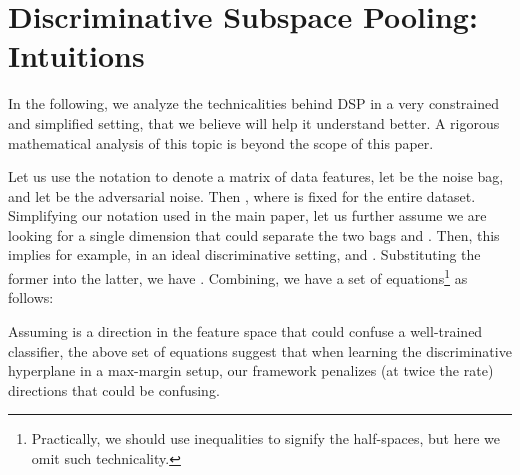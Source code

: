 \documentclass[runningheads]{llncs}
\newcommand{\comment}[1]{}
\begin{document}




\author{Jue Wang\and
Anoop Cherian}



\maketitle


\section{Discriminative Subspace Pooling: Intuitions}
In the following, we analyze the technicalities behind DSP in a very constrained and simplified setting, that we believe will help it understand better. A rigorous mathematical analysis of this topic is beyond the scope of this paper.

Let us use the notation  to denote a matrix of  data features, let  be the noise bag, and let  be the adversarial noise. Then , where  is fixed for the entire dataset. Simplifying our notation used in the main paper, let us further assume we are looking for a single dimension  that could separate the two bags  and . Then, this implies for example, in an ideal discriminative setting,  and . Substituting the former into the latter, we have . Combining, we have a set of  equations\footnote{Practically, we should use inequalities to signify the half-spaces, but here we omit such technicality.} as follows:

Assuming  is a direction in the feature space that could confuse a well-trained classifier, the above set of equations suggest that when learning the discriminative hyperplane in a max-margin setup, our framework penalizes (at twice the rate) directions that could be confusing.

\comment{
Let us further simplify this setting. Suppose we are working in a 2D feature space, where say  is a data point. Hypothetically, let  be 1D a CNN feature capturing the video background, while let  captures the dynamics. When learning the noise, suppose that the dimension  might be easier to make a classifier to mis-classify (vice versa). Based on this, assuming  regularization on the noise patterns, the learned universal perturbation   would be  (noise will be added on the easily mis-classified dimension) . In this case, our negative bag is given by . Using the above equations~\eqref{eq:hype_1}~\eqref{eq:hype_2}, assuming  is the discriminative direction, then we can show that

where the second dimension, which is vulnerable to noise, is made a constant, and the other dimensions undergoes a non-linear transformation with respect to the data dimensions  and  and the noise  -- the entire setting can be seen as a dimensionality reduction and a non-linear transformation.  }
\end{document}
